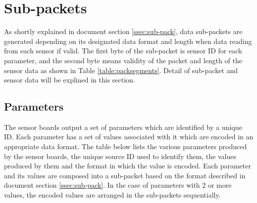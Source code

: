\newpage
\section{Sub-packets}

As shortly explained in document section \ref{ssec:sub-pack}, data sub-packets are generated depending on its designated data format and length when data reading from each sensor if valid. The first byte of the sub-packet is sensor ID for each parameter, and the second byte means validity of the packet and length of the sensor data as shown in Table \ref{table:packsegments}. Detail of sub-packet and sensor data will be explined in this section.


\subsection{Parameters}

The sensor boards output a set of parameters which are identified by a unique ID. Each parameter
has a set of values associated with it which are encoded in an appropriate data format. The table
below lists the various parameters produced by the sensor boards, the unique source ID used to identify them, the values produced by them and the format in which the value is encoded.
Each parameter and its values are composed into a sub-packet based on
the format described in document section \ref{ssec:sub-pack}.
In the case of parameters with 2 or more values, the encoded values are
arranged in the sub-packets sequentially. 

